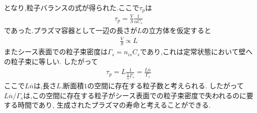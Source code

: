 \documentclass[uplatex,a4j,11pt,dvipdfmx]{jsarticle}
\begin{document}
となり,粒子バランスの式が得られた.ここで$\tau_p$は
\begin{align}
  \tau_p=\frac{V}{S}\frac{1}{\alpha C_s}
\end{align}
であった.プラズマ容器として一辺の長さが$L$の立方体を仮定すると
\begin{align}
  \frac{V}{S}\propto L
\end{align}
またシース表面での粒子束密度は$\Gamma_s=n_{is}C_s$であり,これは定常状態において壁への粒子束に等しい.
したがって
\begin{align}
  \tau_p=L\frac{1}{\frac{1}{\overline{n}}\Gamma_s}=\frac{L\overline{n}}{\Gamma_s}
\end{align}
ここで$L\overline{n}$は,長さ$L$,断面積$1$の空間に存在する粒子数と考えられる.
したがって$L\overline{n}/\Gamma_s$は,この空間に存在する粒子がシース表面での粒子束密度で失われるのに要する時間であり,
生成されたプラズマの寿命と考えることができる.

\end{document}
